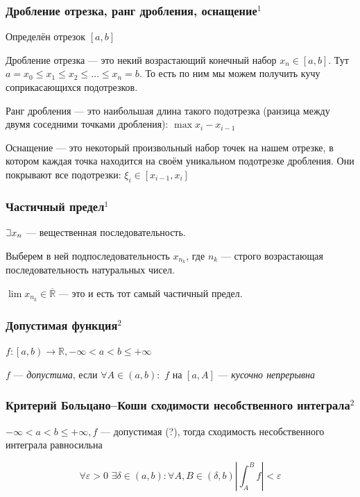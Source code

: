 \documentclass{article}
\def\letus{%
\mathord{\setbox0=\hbox{$\exists$}%
         \hbox{\kern 0.125\wd0%
               \vbox to \ht0{%
                  \hrule width 0.75\wd0%
                  \vfill%
                  \hrule width 0.75\wd0}%
               \vrule height \ht0%
               \kern 0.125\wd0}%
       }%
        }
\def\dbl{\,\,}
\begin{document}
\subsubsection{Дробление отрезка, ранг дробления, оснащение\texorpdfstring{$^1$}{}}
Определён отрезок $[a, b]$

Дробление отрезка --- это некий возрастающий конечный набор $x_n\in [a, b]$. Тут $a = x_0 \le x_1 \le x_2 \le \ldots \le x_n = b$.
То есть по ним мы можем получить кучу соприкасающихся подотрезков.

Ранг дробления --- это наибольшая длина такого подотрезка (ранзица между двумя соседними точками дробления): $\max x_i - x_{i-1}$

Оснащение --- это некоторый произвольный набор точек на нашем отрезке, в котором каждая точка находится на своём уникальном подотрезке дробления. Они покрывают все подотрезки: $\xi_i \in [x_{i-1}, x_i]$

\subsubsection{Частичный предел\texorpdfstring{$^1$}{}}
$\letus x_n$ --- вещественная последовательность.

Выберем в ней подпоследовательность $x_{n_k}$, где $n_k$ --- строго возрастающая последовательность натуральных чисел.

$\lim x_{n_k} \in \overline{\mathbb{R}}$ --- это и есть тот самый частичный предел.

\subsubsection{Допустимая функция\texorpdfstring{$^2$}{}}

$f: \left[a, b\right) \rightarrow \mathbb{R}, -\infty < a < b \le +\infty$

$f$ --- \textit{допустима}, если $\forall A \in \left(a, b\right):$ $f$ на $\left[a, A\right]$ --- \textit{кусочно непрерывна}

\subsubsection{Критерий Больцано--Коши сходимости несобственного интеграла\texorpdfstring{$^2$}{}}

$-\infty < a < b \le +\infty, f$ --- допустимая (?), тогда сходимость несобственного интеграла равносильна 

\[\forall \varepsilon > 0 \dbl \exists \delta \in (a, b) : \forall A, B \in (\delta, b) \left|\int_A^B f\right| < \varepsilon \]
\end{document}
